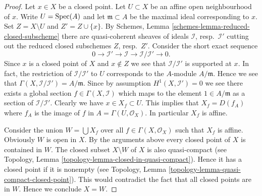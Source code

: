 \begin{proof}
Let $x \in X$ be a closed point. Let $U \subset X$ be an affine open
neighbourhood of $x$. Write $U = \mathop{\mathrm{Spec}}(A)$ and let
$\mathfrak m \subset A$ be the maximal ideal corresponding to $x$.
Set $Z = X \setminus U$ and $Z' = Z \cup \{x\}$.
By Schemes, Lemma \ref{schemes-lemma-reduced-closed-subscheme} there
are quasi-coherent sheaves of ideals
$\mathcal{I}$, resp.\ $\mathcal{I}'$ cutting out
the reduced closed subschemes $Z$, resp.\ $Z'$.
Consider the short exact sequence
$$
0 \to \mathcal{I}' \to \mathcal{I} \to \mathcal{I}/\mathcal{I}' \to 0.
$$
Since $x$ is a closed point of $X$ and $x \not \in Z$ we see that
$\mathcal{I}/\mathcal{I}'$ is supported at $x$. In fact, the restriction
of $\mathcal{I}/\mathcal{I'}$ to $U$ corresponds to the $A$-module
$A/\mathfrak m$. Hence we see that $\Gamma(X, \mathcal{I}/\mathcal{I'})
= A/\mathfrak m$. Since by assumption $H^1(X, \mathcal{I}') = 0$
we see there exists a global section $f \in \Gamma(X, \mathcal{I})$
which maps to the element $1 \in A/\mathfrak m$ as a section of
$\mathcal{I}/\mathcal{I'}$. Clearly we have
$x \in X_f \subset U$. This implies that $X_f = D(f_A)$ where
$f_A$ is the image of $f$ in $A = \Gamma(U, \mathcal{O}_X)$.
In particular $X_f$ is affine.

\medskip\noindent
Consider the union $W = \bigcup X_f$ over all $f \in \Gamma(X, \mathcal{O}_X)$
such that $X_f$ is affine. Obviously $W$ is open in $X$.
By the arguments above every closed point of
$X$ is contained in $W$. The closed subset $X \setminus W$ of $X$
is also quasi-compact
(see Topology, Lemma \ref{topology-lemma-closed-in-quasi-compact}).
Hence it has a closed point if it is nonempty (see
Topology, Lemma \ref{topology-lemma-quasi-compact-closed-point}).
This would contradict the fact that all closed points are in
$W$. Hence we conclude $X = W$.


\end{proof}
